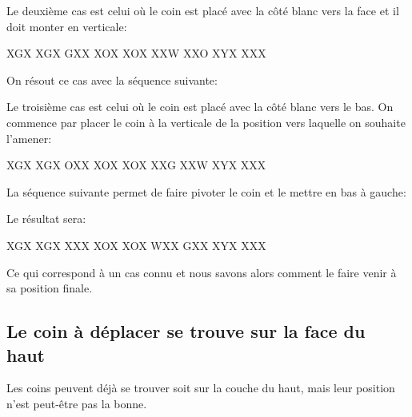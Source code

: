 Le deuxième cas est celui où le coin est placé avec la côté blanc vers
la face et il doit monter en verticale: 

\begin{center}
	\RubikFaceRight%
	{X}{G}{X}%
	{X}{G}{X}%
	{G}{X}{X}
	\RubikFaceFront%
	{X}{O}{X}%
	{X}{O}{X}%
	{X}{X}{W}
	\RubikFaceDown%
	{X}{X}{O}%
	{X}{Y}{X}%
	{X}{X}{X}
	
\end{center} 

On résout ce cas avec la séquence suivante:


Le troisième cas est celui où le coin est placé avec la côté blanc vers
le bas. On commence par placer le coin à la verticale de la position
vers laquelle on souhaite l'amener:

\begin{center}
	\RubikFaceRight%
	{X}{G}{X}%
	{X}{G}{X}%
	{O}{X}{X}
	\RubikFaceFront%
	{X}{O}{X}%
	{X}{O}{X}%
	{X}{X}{G}
	\RubikFaceDown%
	{X}{X}{W}%
	{X}{Y}{X}%
	{X}{X}{X}
	
\end{center} 

La séquence suivante permet de faire pivoter le coin et le mettre en bas à gauche: 

\begin{samepage}
Le résultat sera:

\begin{center}
	\RubikFaceRight%
	{X}{G}{X}%
	{X}{G}{X}%
	{X}{X}{X}
	\RubikFaceFront%
	{X}{O}{X}%
	{X}{O}{X}%
	{W}{X}{X}
	\RubikFaceDown%
	{G}{X}{X}%
	{X}{Y}{X}%
	{X}{X}{X}
	
\end{center} 
\end{samepage}
	
Ce qui correspond à un cas connu et nous savons alors comment le faire
venir à sa position finale.

\subsection{Le coin à déplacer se trouve sur la face du haut}

Les coins peuvent déjà se trouver soit sur la couche du haut, mais leur
position n'est peut-être pas la bonne.

